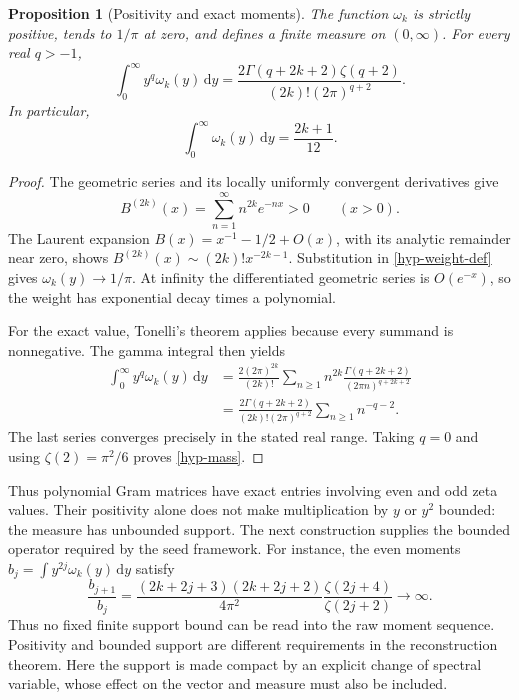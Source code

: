 \documentclass[11pt,a4paper]{article}
\numberwithin{equation}{section}
\newtheorem{proposition}[theorem]{Proposition}
\theoremstyle{definition}
\theoremstyle{remark}
\newcommand{\dd}{\,\mathrm d}
\begin{document}
\begin{proposition}[Positivity and exact moments]\label{hyp-moment-prop}
The function $\omega_k$ is strictly positive, tends to $1/\pi$ at zero,
and defines a finite measure on $(0,\infty)$. For every real $q>-1$,
\begin{equation}\label{hyp-mellin}
\int_0^\infty y^q\omega_k(y)\dd y
=\frac{2\Gamma(q+2k+2)\zeta(q+2)}
{(2k)!(2\pi)^{q+2}}.
\end{equation}
In particular,
\begin{equation}\label{hyp-mass}
\int_0^\infty\omega_k(y)\dd y=\frac{2k+1}{12}.
\end{equation}
\end{proposition}
\begin{proof}
The geometric series and its locally uniformly convergent derivatives
give
\[
B^{(2k)}(x)=\sum_{n=1}^{\infty}n^{2k}e^{-nx}>0\qquad(x>0).
\]
The Laurent expansion $B(x)=x^{-1}-1/2+O(x)$, with its analytic
remainder near zero, shows
$B^{(2k)}(x)\sim(2k)!x^{-2k-1}$. Substitution in
\eqref{hyp-weight-def} gives $\omega_k(y)\to1/\pi$.
At infinity the differentiated geometric series is $O(e^{-x})$,
so the weight has exponential decay times a polynomial.

For the exact value, Tonelli's theorem applies because every summand is
nonnegative. The gamma integral then yields
\begin{align*}
\int_0^\infty y^q\omega_k(y)\dd y
&=\frac{2(2\pi)^{2k}}{(2k)!}
\sum_{n\geq1}n^{2k}
\frac{\Gamma(q+2k+2)}{(2\pi n)^{q+2k+2}}\\
&=\frac{2\Gamma(q+2k+2)}{(2k)!(2\pi)^{q+2}}
\sum_{n\geq1}n^{-q-2}.
\end{align*}
The last series converges precisely in the stated real range. Taking
$q=0$ and using $\zeta(2)=\pi^2/6$ proves \eqref{hyp-mass}.
\end{proof}

Thus polynomial Gram matrices have exact entries involving even and odd
zeta values. Their positivity alone does not make multiplication by $y$
or $y^2$ bounded: the measure has unbounded support. The next construction
supplies the bounded operator required by the seed framework.
For instance, the even moments $b_j=\int y^{2j}\omega_k(y)\dd y$
satisfy
\begin{equation}\label{hyp-raw-ratio}
\frac{b_{j+1}}{b_j}
=\frac{(2k+2j+3)(2k+2j+2)}{4\pi^2}
\frac{\zeta(2j+4)}{\zeta(2j+2)}\longrightarrow\infty.
\end{equation}
Thus no fixed finite support bound can be read into the raw moment
sequence. Positivity and bounded support are different requirements in
the reconstruction theorem. Here the support is made compact by an
explicit change of spectral variable, whose effect on the vector and
measure must also be included.
\end{document}
